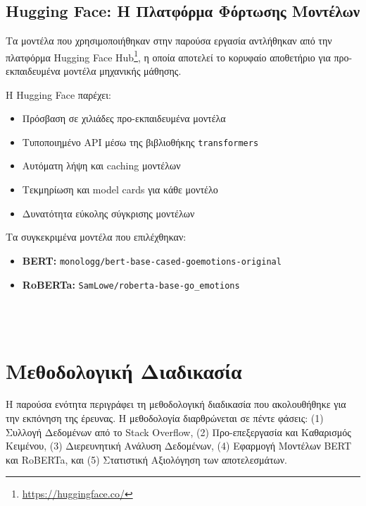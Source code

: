 \documentclass[a4paper,11pt,oneside,openany]{ioniothesis}
\begin{document}
\subsection{Hugging Face: Η Πλατφόρμα Φόρτωσης Μοντέλων}
\label{sec:Hugging Face Η Πλατφόρμα Φόρτωσης Μοντέλων}

Τα μοντέλα που χρησιμοποιήθηκαν στην παρούσα εργασία αντλήθηκαν από την πλατφόρμα Hugging Face Hub\footnote{\url{https://huggingface.co/}}, η οποία αποτελεί το κορυφαίο αποθετήριο για προ-εκπαιδευμένα μοντέλα μηχανικής μάθησης.

Η Hugging Face παρέχει:
\begin{itemize}
    \item Πρόσβαση σε χιλιάδες προ-εκπαιδευμένα μοντέλα
    \item Τυποποιημένο API μέσω της βιβλιοθήκης \texttt{transformers}
    \item Αυτόματη λήψη και caching μοντέλων
    \item Τεκμηρίωση και model cards για κάθε μοντέλο
    \item Δυνατότητα εύκολης σύγκρισης μοντέλων
\end{itemize}

Τα συγκεκριμένα μοντέλα που επιλέχθηκαν:
\begin{itemize}
    \item \textbf{BERT:} \texttt{monologg/bert-base-cased-goemotions-original}
    \item \textbf{RoBERTa:} \texttt{SamLowe/roberta-base-go\_emotions}
\end{itemize}






\\
\\


\section{Μεθοδολογική Διαδικασία}
\label{sec:Μεθοδολογική Διαδικασία}

Η παρούσα ενότητα περιγράφει τη μεθοδολογική διαδικασία που ακολουθήθηκε για την εκπόνηση της έρευνας. Η μεθοδολογία διαρθρώνεται σε πέντε φάσεις: (1) Συλλογή Δεδομένων από το Stack Overflow, (2) Προ-επεξεργασία και Καθαρισμός Κειμένου, (3) Διερευνητική Ανάλυση Δεδομένων, (4) Εφαρμογή Μοντέλων BERT και RoBERTa, και (5) Στατιστική Αξιολόγηση των αποτελεσμάτων.
\end{document}
